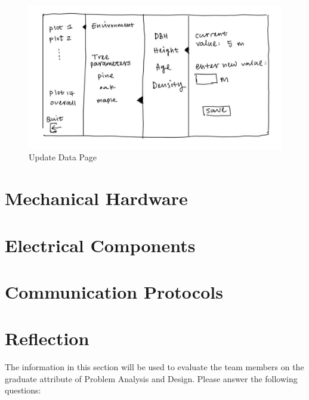 \documentclass[12pt, titlepage]{article}
\begin{document}
\begin{figure}[H]
    \centering
    \includegraphics[scale=0.4]{SysDesPic/AppendixA-4.jpeg}
    \caption{Update Data Page}
\end{figure}


\section{Mechanical Hardware}

\section{Electrical Components}

\section{Communication Protocols}

\section{Reflection}

The information in this section will be used to evaluate the team members on the
graduate attribute of Problem Analysis and Design.  Please answer the following questions:
\end{document}
